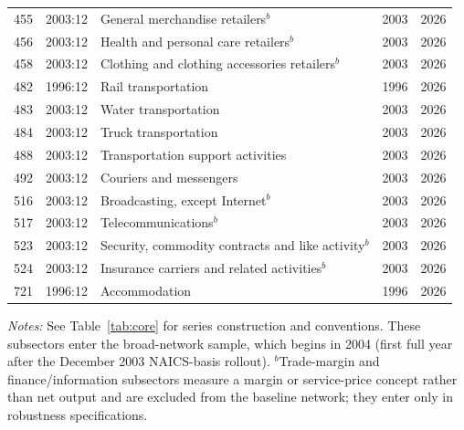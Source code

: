 {\begin{longtable}{llp{5cm}cc}
455 & 2003:12 & General merchandise retailers$^{b}$ & 2003 & 2026 \\
456 & 2003:12 & Health and personal care retailers$^{b}$ & 2003 & 2026 \\
458 & 2003:12 & Clothing and clothing accessories retailers$^{b}$ & 2003 & 2026 \\
482 & 1996:12 & Rail transportation & 1996 & 2026 \\
483 & 2003:12 & Water transportation & 2003 & 2026 \\
484 & 2003:12 & Truck transportation & 2003 & 2026 \\
488 & 2003:12 & Transportation support activities & 2003 & 2026 \\
492 & 2003:12 & Couriers and messengers & 2003 & 2026 \\
516 & 2003:12 & Broadcasting, except Internet$^{b}$ & 2003 & 2026 \\
517 & 2003:12 & Telecommunications$^{b}$ & 2003 & 2026 \\
523 & 2003:12 & Security, commodity contracts and like activity$^{b}$ & 2003 & 2026 \\
524 & 2003:12 & Insurance carriers and related activities$^{b}$ & 2003 & 2026 \\
721 & 1996:12 & Accommodation & 1996 & 2026 \\
\end{longtable}
\par\vspace{-0.4em}\textit{Notes:}  See Table~\ref{tab:core} for series construction and conventions. These subsectors enter the broad-network sample, which begins in 2004 (first full year after the December 2003 NAICS-basis rollout). $^{b}$Trade-margin and finance/information subsectors measure a margin or service-price concept rather than net output and are excluded from the baseline network; they enter only in robustness specifications. 
}
